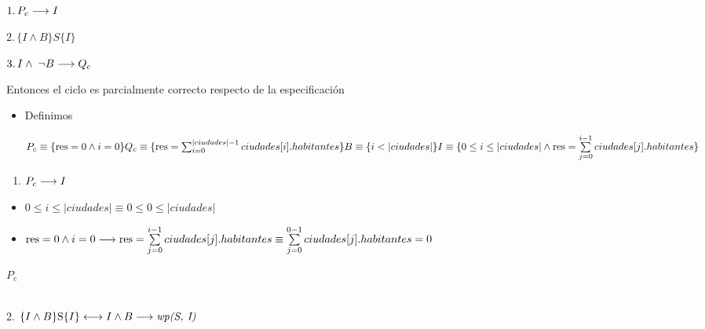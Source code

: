 \documentclass[10pt,a4paper]{article}
\begin{document}
$1. \, P_{c} \longrightarrow I$

$2. \, \{I \wedge B\} S \{I\}$

$3. \, I \wedge \; \neg B \longrightarrow Q_{c}$

Entonces el ciclo es parcialmente correcto respecto de la especificación

\vspace{0.3cm}
\begin{itemize}

	\item{Definimos}

	      $P_{c}  \equiv \{ \text{res} = 0 \wedge i=0 \}           \\ \vspace{0.1cm} Q_{c}  \equiv
		      \{ \text{res} = \sum_{i=0}^{|ciudades|-1} ciudades[i].habitantes \} \\
		      \vspace{0.1cm} B  \equiv \{i < |ciudades| \}                       \\ \vspace{0.1cm} I  \equiv \{ 0
		      \leq i \leq |ciudades| \land \text{res} =
		      \sum\limits_{j=0}^{i-1}ciudades[j].habitantes \}$

\end{itemize}


\begin{enumerate}
	\item $P_{c} \longrightarrow I$
\end{enumerate}
\begin{itemize}
	\item $0 \leq i \leq |ciudades| \equiv 0 \leq 0 \leq |ciudades|  $ %
	\item $\text{res} = 0 \land i = 0 \longrightarrow \text{res} = \sum\limits_{j=0}^{i-1}ciudades[j].habitantes \equiv \sum\limits_{j=0}^{0-1}ciudades[j].habitantes = 0$ %
\end{itemize}

$P_{c}$ \implica {}

\vspace{0.3cm}

\\  \vspace{0.4cm} 2. $  {\{I \land B\}} \text{S} {\{{I}\}
		\longleftrightarrow {I \land B} \ensuremath{\longrightarrow}\textit{wp(S, I)}}$
\end{document}

